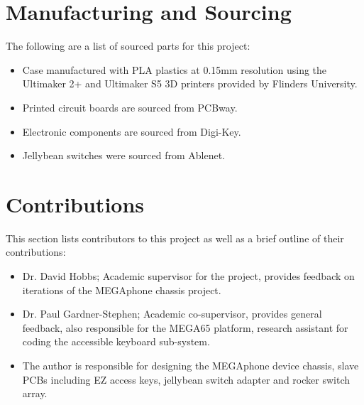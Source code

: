 
\section{Manufacturing and Sourcing}

The following are a list of sourced parts for this project:

\begin{itemize} 
    \item Case manufactured with PLA plastics at 0.15mm resolution using the Ultimaker 2+ and Ultimaker S5 3D printers provided by Flinders University.
    \item Printed circuit boards are sourced from PCBway.
    \item Electronic components are sourced from Digi-Key.
    \item Jellybean switches were sourced from Ablenet.
    \end{itemize}


\section{Contributions}

This section lists contributors to this project as well as a brief outline of their contributions:

\begin{itemize} 
    \item Dr. David Hobbs; Academic supervisor for the project, provides feedback on iterations of the MEGAphone chassis project.
    \item Dr. Paul Gardner-Stephen; Academic co-supervisor, provides general feedback, also responsible for the MEGA65 platform, research assistant for coding the accessible keyboard sub-system. %
    \item The author is responsible for designing the MEGAphone device chassis, slave PCBs including EZ access keys, jellybean switch adapter and rocker switch array.
    \end{itemize}
